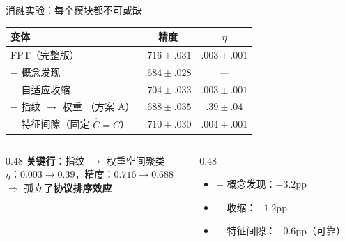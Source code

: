 \documentclass[aspectratio=169,11pt]{ctexbeamer}
\begin{document}
\begin{frame}{消融实验：每个模块都不可或缺}

\centering
{\small
\begin{tabular}{@{}lcc@{}}
\toprule
变体 & 精度 & $\eta$ \\
\midrule
FPT（完整版） & $.716 \pm .031$ & $.003 \pm .001$ \\
\quad $-$ 概念发现 & $.684 \pm .028$ & --- \\
\quad $-$ 自适应收缩 & $.704 \pm .033$ & $.003 \pm .001$ \\
\quad $-$ 指纹 $\to$ 权重 \textcolor{cA}{（方案 A）} & $.688 \pm .035$ & \textcolor{cA}{$.39 \pm .04$} \\
\quad $-$ 特征间隙（固定 $\hat{C} {=} C$） & $.710 \pm .030$ & $.004 \pm .001$ \\
\bottomrule
\end{tabular}
}

\vspace{2pt}
\begin{columns}[T]
\begin{column}{0.48\textwidth}
\textbf{关键行}：指纹 $\to$ 权重空间聚类\\
$\eta$：$0.003 \to 0.39$，精度：$0.716 \to 0.688$\\[2pt]
\textcolor{cA}{$\Rightarrow$ 孤立了\textbf{协议排序效应}}
\end{column}
\begin{column}{0.48\textwidth}
\begin{itemize}\setlength\itemsep{0pt}
  \item $-$ 概念发现：$-3.2$pp
  \item $-$ 收缩：$-1.2$pp
  \item $-$ 特征间隙：$-0.6$pp（可靠）
\end{itemize}
\end{column}
\end{columns}
\end{frame}
\end{document}
